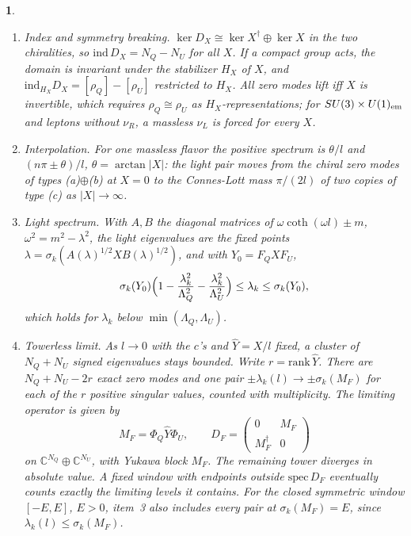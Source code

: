 \documentclass[aps,prd,reprint,onecolumn,nofootinbib,amsmath,amssymb,floatfix]{revtex4-2}
\theoremstyle{plain}
\newcommand{\resultname}{}
\newtheorem*{resultenv}{\resultname}
\newenvironment{result}[1]{\renewcommand{\resultname}{#1}\begin{resultenv}}{\end{resultenv}}
\newcommand{\C}{\mathbb C}
\begin{document}
\begin{result}{Theorem C}
\begin{enumerate}
\item \emph{Index and symmetry breaking.} $\ker D_X\cong\ker X^\dagger\oplus\ker X$ in the two chiralities, so $\mathrm{ind}\,D_X=N_Q-N_U$ for all $X$. If a compact group acts, the domain is invariant under the stabilizer $H_X$ of $X$, and $\mathrm{ind}_{H_X}D_X=[\rho_Q]-[\rho_U]$ restricted to $H_X$. All zero modes lift iff $X$ is invertible, which requires $\rho_Q\cong\rho_U$ as $H_X$-representations; for $SU(3)\times U(1)_{\rm em}$ and leptons without $\nu_R$, a massless $\nu_L$ is forced for every $X$.
\item \emph{Interpolation.} For one massless flavor the positive spectrum is $\theta/l$ and $(n\pi\pm\theta)/l$, $\theta=\arctan|X|$: the light pair moves from the chiral zero modes of types (a)$\oplus$(b) at $X=0$ to the Connes-Lott mass $\pi/(2l)$ of two copies of type (c) as $|X|\to\infty$.
\item \emph{Light spectrum.} With $A,B$ the diagonal matrices of $\omega\coth(\omega l)\pm m$, $\omega^2=m^2-\lambda^2$, the light eigenvalues are the fixed points $\lambda=\sigma_k(A(\lambda)^{1/2}XB(\lambda)^{1/2})$, and with $Y_0=F_QXF_U$,
\begin{equation}
\sigma_k(Y_0)\Bigl(1-\frac{\lambda_k^2}{\Lambda_Q^2}-\frac{\lambda_k^2}{\Lambda_U^2}\Bigr)\le\lambda_k\le\sigma_k(Y_0),
\end{equation}
which holds for $\lambda_k$ below $\min(\Lambda_Q,\Lambda_U)$.
\item \emph{Towerless limit.} As $l\to0$ with the $c$'s and $\hat Y=X/l$ fixed, a cluster of $N_Q+N_U$ signed eigenvalues stays bounded. Write $r=\mathrm{rank}\,\hat Y$. There are $N_Q+N_U-2r$ exact zero modes and one pair $\pm\lambda_k(l)\to\pm\sigma_k(M_F)$ for each of the $r$ positive singular values, counted with multiplicity. The limiting operator is given by
\begin{equation}
M_F=\Phi_Q\hat Y\Phi_U,\qquad D_F=\begin{pmatrix}0&M_F\\ M_F^\dagger&0\end{pmatrix}
\end{equation}
on $\C^{N_Q}\oplus\C^{N_U}$, with Yukawa block $M_F$. The remaining tower diverges in absolute value. A fixed window with endpoints outside $\mathrm{spec}\,D_F$ eventually counts exactly the limiting levels it contains. For the closed symmetric window $[-E,E]$, $E>0$, item~3 also includes every pair at $\sigma_k(M_F)=E$, since $\lambda_k(l)\le\sigma_k(M_F)$.

\end{enumerate}
\end{result}
\end{document}
